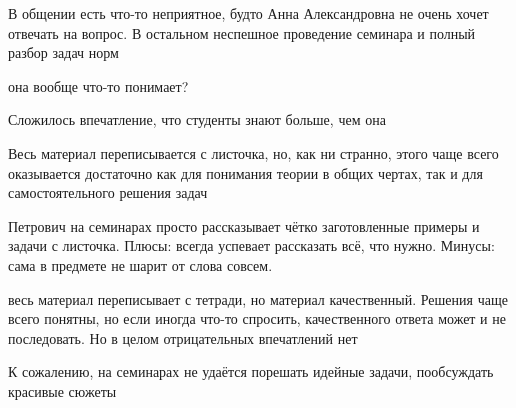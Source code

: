             \begin{commentbox} 
                В общении есть что-то неприятное, будто Анна Александровна не очень хочет отвечать на вопрос. В остальном неспешное проведение семинара и полный разбор задач норм 
            \end{commentbox} 
        
            \begin{commentbox} 
                она вообще что-то понимает? 
            \end{commentbox} 
        
            \begin{commentbox} 
                Сложилось впечатление, что студенты знают больше, чем она 
            \end{commentbox} 
        
            \begin{commentbox} 
                Весь материал переписывается с листочка, но, как ни странно, этого чаще всего оказывается достаточно как для понимания теории в общих чертах, так и для самостоятельного решения задач 
            \end{commentbox} 
        
            \begin{commentbox} 
                Петрович на семинарах просто рассказывает чётко заготовленные примеры и задачи с листочка.
                Плюсы: всегда успевает рассказать всё, что нужно.
                Минусы: сама в предмете не шарит от слова совсем. 
            \end{commentbox} 
        
            \begin{commentbox} 
                весь материал переписывает с тетради, но материал качественный. Решения чаще всего понятны, но если иногда что-то спросить, качественного ответа может и не последовать. Но в целом отрицательных впечатлений нет 
            \end{commentbox} 
        
            \begin{commentbox} 
                К сожалению, на семинарах не удаётся порешать идейные задачи, пообсуждать красивые сюжеты 
            \end{commentbox}


